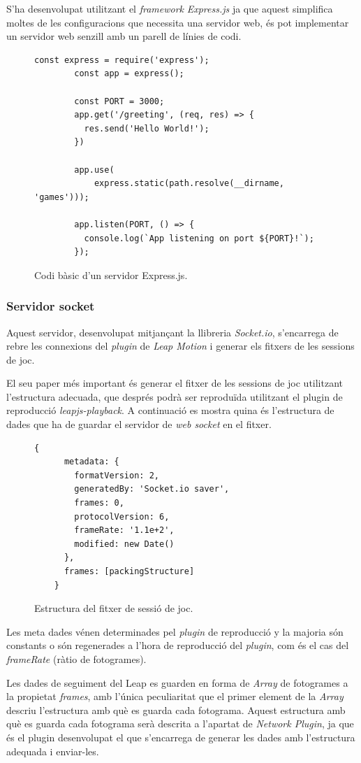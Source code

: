 \documentclass[12pt,a4paper,catalan]{article}
\begin{document}
	S'ha desenvolupat utilitzant el \textit{framework} \textit{Express.js} ja que aquest simplifica moltes de les configuracions que necessita una servidor web, és pot implementar un servidor web senzill amb un parell de línies de codi.
	\begin{figure}[H]
		\begin{lstlisting}[]
		const express = require('express');
		const app = express();
		
		const PORT = 3000;
		app.get('/greeting', (req, res) => {
		  res.send('Hello World!');
		})
		
		app.use(
			express.static(path.resolve(__dirname, 'games')));
		
		app.listen(PORT, () => {
		  console.log(`App listening on port ${PORT}!`);
		});
		\end{lstlisting}
		\caption{Codi bàsic d'un servidor Express.js.}
		\label{fig:express-basic}
	\end{figure}
	\subsubsection{Servidor socket}
	Aquest servidor, desenvolupat mitjançant la llibreria \textit{Socket.io}, s'encarrega de rebre les connexions del \textit{plugin} de \textit{Leap Motion} i generar els fitxers de les sessions de joc.
	
	El seu paper més important és generar el fitxer de les sessions de joc utilitzant l'estructura adecuada, que després podrà ser reproduïda utilitzant el plugin de reproducció \textit{leapjs-playback}. A continuació es mostra quina és l'estructura de dades que ha de guardar el servidor de \textit{web socket} en el fitxer.
	\begin{figure}[H]
	\begin{lstlisting}[]
	{
	  metadata: {
	    formatVersion: 2,
	    generatedBy: 'Socket.io saver',
	    frames: 0,
	    protocolVersion: 6,
	    frameRate: '1.1e+2',
	    modified: new Date()
	  },
	  frames: [packingStructure]
	}
	\end{lstlisting}
		\caption{Estructura del fitxer de sessió de joc.}
		\label{fig:recording-structure}
	\end{figure}
	Les meta dades vénen determinades pel \textit{plugin} de reproducció y la majoria són constants o són regenerades a l'hora de reproducció del \textit{plugin}, com és el cas del \textit{frameRate} (ràtio de fotogrames).
	
	Les dades de seguiment del Leap es guarden en forma de \textit{Array} de fotogrames a la propietat \textit{frames}, amb l'única peculiaritat que el primer element de la \textit{Array} descriu l'estructura amb què es guarda cada fotograma. Aquest estructura amb què es guarda cada fotograma serà descrita a l'apartat de \textit{Network Plugin}, ja que és el plugin desenvolupat el que s'encarrega de generar les dades amb l'estructura adequada i enviar-les.
	
\end{document}
